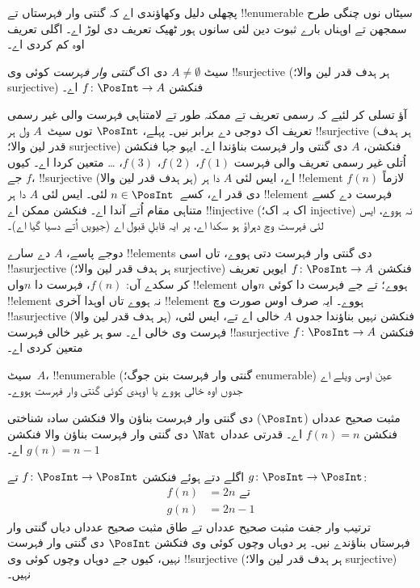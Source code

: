 \documentclass[../../../include/open-logic-section]{subfiles}
\begin{document}
پچھلی دلیل وکھاؤندی اے کہ گنتی وار فہرستاں تے !!{enumerable} سیٹاں
نوں چنگی طرح سمجھن تے اوہناں بارے ثبوت دین لئی سانوں ہور ٹھیک تعریف
دی لوڑ اے۔ اگلی تعریف اوہ کم کردی اے۔

\begin{defn}
سیٹ $A \neq \emptyset$ دی اک \emph{گنتی وار فہرست} کوئی وی
!!{surjective} (ہر ہدف قدر لین والا؛ surjective) فنکشن
$f \colon \PosInt \to A$ اے۔
\end{defn}

\begin{explain}
آؤ تسلی کر لئیے کہ رسمی تعریف تے ممکنہ طور تے لامتناہی فہرست والی
غیر رسمی تعریف اک دوجی دے برابر نیں۔ پہلے، $\PosInt$ توں سیٹ~$A$ ول
ہر !!{surjective} (ہر ہدف قدر لین والا؛ surjective) فنکشن، $A$ دی
گنتی وار فہرست بناؤندا اے۔ ایہو جہا
فنکشن اُتلی غیر رسمی تعریف والی فہرست $f(1)$، $f(2)$، $f(3)$، \dots
متعین کردا اے۔ کیوں جے $f$، !!{surjective} (ہر ہدف قدر لین والا) اے،
ایس لئی $A$ دا ہر
!!{element} لازماً $f(n)$ دی قدر اے، کسے~$n \in \PosInt$ لئی۔ ایس
لئی $A$ دا ہر !!{element} فہرست دے کسے متناہی مقام اُتے آندا اے۔
فنکشن ممکن اے !!{injective} (اک بہ اک؛ injective) نہ ہووے، ایس لئی
فہرست وچ دہراؤ ہو سکدا
اے، پر ایہ قابلِ قبول اے (جیویں اُتے دسیا گیا اے)۔

دوجے پاسے، $A$ دے سارے !!{element}s دی گنتی وار فہرست دتی ہووے، تاں
اسی !!a{surjective} (ہر ہدف قدر لین والا؛ surjective) فنکشن
$f\colon \PosInt \to A$ ایویں تعریف کر
سکدے آں: $f(n)$، فہرست دا $n$واں !!{element} ہووے؛ تے جے فہرست دا
کوئی $n$واں !!{element} نہ ہووے تاں اوہدا آخری !!{element} ہووے۔
ایہ صرف اوس صورت وچ !!a{surjective} (ہر ہدف قدر لین والا) فنکشن نہیں
بناؤندا جدوں $A$ خالی اے تے، ایس لئی، فہرست وی خالی اے۔ سو ہر غیر
خالی فہرست !!a{surjective} فنکشن $f\colon \PosInt \to A$ متعین کردی اے۔
\end{explain}

\begin{defn}
  سیٹ~$A$، !!{enumerable} (گنتی وار فہرست بنن جوگ؛ enumerable) عین
  اوس ویلے اے جدوں اوہ خالی ہووے یا اوہدی کوئی گنتی وار فہرست ہووے۔
\end{defn}

\begin{ex}
مثبت صحیح عدداں ($\PosInt$) دی گنتی وار فہرست بناؤن والا فنکشن سادہ
شناختی فنکشن $f(n) = n$ اے۔ قدرتی عدداں $\Nat$ دی گنتی وار فہرست
بناؤن والا فنکشن $g(n) = n - 1$ اے۔
\end{ex}

\begin{ex}
اگلے دتے ہوئے فنکشن $f\colon \PosInt \to \PosInt$ تے
$g \colon \PosInt \to \PosInt$:
\begin{align*}
f(n) & = 2n \text{ تے}\\
g(n) & = 2n - 1
\end{align*}
ترتیب وار جفت مثبت صحیح عدداں تے طاق مثبت صحیح عدداں دیاں گنتی وار
فہرستاں بناؤندے نیں۔ پر دوہاں وچوں کوئی وی فنکشن $\PosInt$ دی گنتی
وار فہرست نہیں، کیوں جے دوہاں وچوں کوئی وی !!{surjective}
(ہر ہدف قدر لین والا؛ surjective) نہیں۔
\end{ex}
\end{document}
